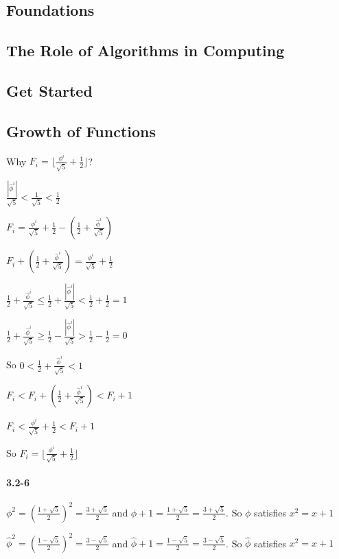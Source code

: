\documentclass{book}
\begin{document}
\begin{CJK}{UTF8}{gkai}
\part{Foundations}
\chapter{The Role of Algorithms in Computing}
\chapter{Get Started}
\chapter{Growth of Functions}

Why $F_i=\lfloor \frac{\phi ^ i}{\sqrt{5}} + \frac{1}{2} \rfloor$?

$\frac{|\hat{\phi}^i|}{\sqrt{5}} < \frac{1}{\sqrt{5}} < \frac{1}{2}$

$F_i = \frac{\phi ^ i}{\sqrt{5}} + \frac{1}{2} - (\frac{1}{2}+ \frac{\hat{\phi}^i}{\sqrt{5}})$

$F_i + (\frac{1}{2}+ \frac{\hat{\phi}^i}{\sqrt{5}})= \frac{\phi ^ i}{\sqrt{5}} + \frac{1}{2}$

$\frac{1}{2}+ \frac{\hat{\phi}^i}{\sqrt{5}} \leq \frac{1}{2}+ \frac{|\hat{\phi}^i|}{\sqrt{5}} < \frac{1}{2} + \frac{1}{2}=1$

$\frac{1}{2}+ \frac{\hat{\phi}^i}{\sqrt{5}} \geq \frac{1}{2} - \frac{|\hat{\phi}^i|}{\sqrt{5}} > \frac{1}{2} - \frac{1}{2}=0$

So $0<\frac{1}{2}+ \frac{\hat{\phi}^i}{\sqrt{5}}<1$

$F_i<F_i + (\frac{1}{2}+ \frac{\hat{\phi}^i}{\sqrt{5}})<F_i+1$

 $F_i<\frac{\phi ^ i}{\sqrt{5}} + \frac{1}{2}<F_i+1$
 
 So $F_i=\lfloor \frac{\phi ^ i}{\sqrt{5}} + \frac{1}{2} \rfloor$

\subsection*{3.2-6}

$\phi^2=(\frac{1+\sqrt{5}}{2})^2=\frac{3+\sqrt{5}}{2}$ and $\phi +
1=\frac{1+\sqrt{5}}{2} = \frac{3+\sqrt{5}}{2}$. So $\phi$ satisfies $x^2=x+1$

$\hat{\phi}^2=(\frac{1-\sqrt{5}}{2})^2=\frac{3-\sqrt{5}}{2}$ and $\hat{\phi} +
1=\frac{1-\sqrt{5}}{2} = \frac{3-\sqrt{5}}{2}$. So $\hat{\phi}$ satisfies $x^2=x+1$


\end{CJK}
\end{document}
